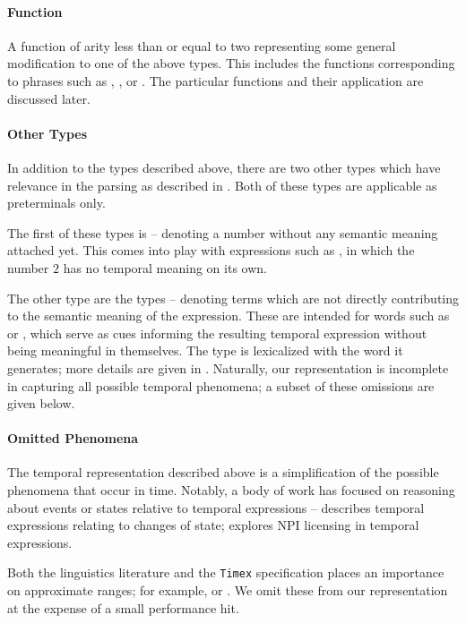 \paragraph{Function}
A function of arity less than or equal to two representing some
	general modification to one of the above types.
This includes the functions corresponding to phrases such as
	, , or .
The particular functions and their application are discussed later.


\paragraph{Other Types}
In addition to the types described above, there are two other types which
	have relevance in the parsing as described in .
Both of these types are applicable as preterminals only.

The first of these types is  -- denoting a number without
	any semantic meaning attached yet.
This comes into play with expressions such as , in which
	the number $2$ has no temporal meaning on its own.

The other type are the  types -- denoting terms which are not
	directly contributing to the semantic meaning of the expression.
These are intended for words such as  or , which serve as cues
	informing the resulting temporal expression without being meaningful
	in themselves.
The  type is lexicalized with the word it generates; more details
	are given in .
Naturally, our representation is incomplete in capturing all possible
	temporal phenomena; a subset of these omissions are given below.


\paragraph{Omitted Phenomena}
The temporal representation described above is a simplification of the
	possible phenomena that occur in time.
Notably, a body of work has focused on reasoning about events or states
	relative to temporal expressions -- 
	 describes temporal expressions relating to
	changes of state; 
	 explores NPI licensing in temporal
	expressions.

Both the linguistics literature and the \texttt{Timex} specification
	places an importance on approximate ranges;
	for example,  or .
We omit these from our representation at the expense of a small performance
	hit.

